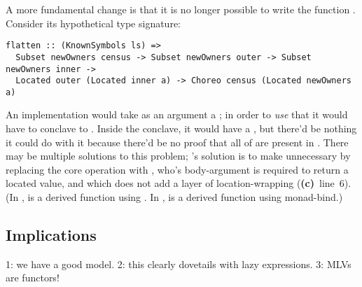 A more fundamental change is that it is no longer possible to write the function .
Consider its hypothetical type signature:
\begin{verbatim}
flatten :: (KnownSymbols ls) =>
  Subset newOwners census -> Subset newOwners outer -> Subset newOwners inner ->
  Located outer (Located inner a) -> Choreo census (Located newOwners a)
\end{verbatim}
An implementation would take as an argument a ;
in order to \emph{use} that it would have to conclave to .
Inside the conclave, it would have a ,
but there'd be nothing it could do with it because there'd be no proof that all of  are present in .
There may be multiple solutions to this problem; \minichor's solution is to make  unnecessary
by replacing the core operation  with ,
who's body-argument is required to return a located value, and which does not add a layer of location-wrapping
(\textbf{(c)}~line~6).
(In \MultiChor,  is a derived function using .
In \minichor,  is a derived function using monad-bind.)


\subsection{Implications}
1: we have a good model.
2: this clearly dovetails with lazy expressions.
3: MLVs are functors!




